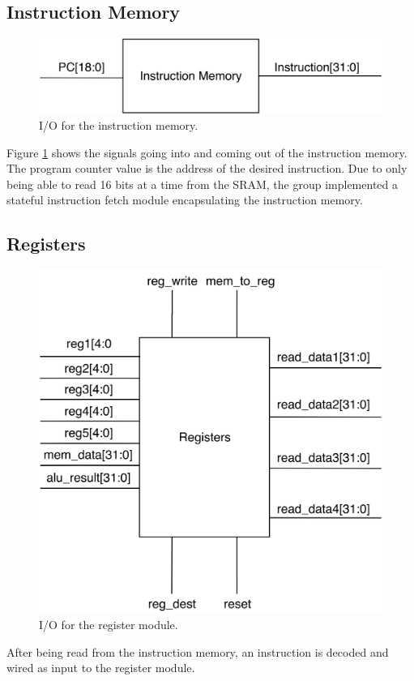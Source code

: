 \subsection{Instruction Memory}

\begin{figure}[h!]
    \includegraphics[width=0.6\linewidth]{images/instruction-memory.png}
    \caption{I/O for the instruction memory.}
    \label{fig:instruction-memory}
\end{figure}

Figure \ref{fig:instruction-memory} shows the signals going into and coming out of the instruction memory.
The program counter value is the address of the desired instruction.
Due to only being able to read 16 bits at a time from the SRAM, the group implemented a stateful instruction fetch module encapsulating the instruction memory.

\subsection{Registers}

\begin{figure}[h!]
    \centering
    \includegraphics[width=0.6\linewidth]{images/registers.png}
    \caption{I/O for the register module.}
    \label{fig:registers}
\end{figure}

After being read from the instruction memory, an instruction is decoded and wired as input to the register module.

